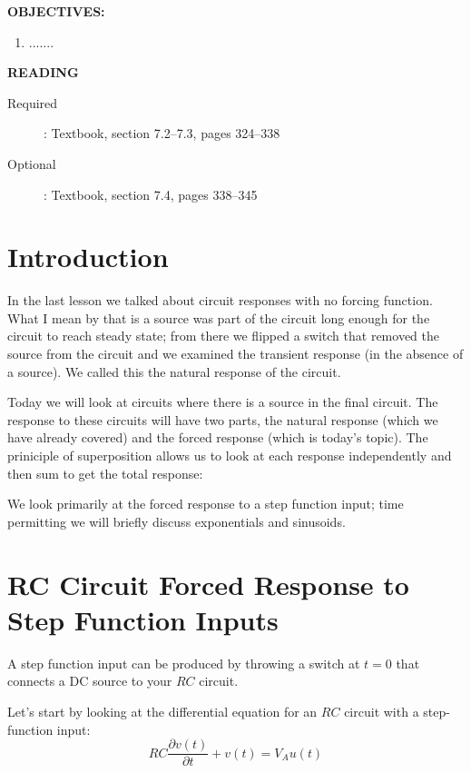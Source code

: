 \documentclass{handout}
\begin{document}
\maketitle

\textbf{OBJECTIVES:}
\begin{enumerate}
\item .......
\end{enumerate}

\textbf{READING}
\begin{description}
\item [Required]:
Textbook, section 7.2--7.3, pages 324--338

\item [Optional]: Textbook, section 7.4, pages 338--345
\end{description}

\section{Introduction}
In the last lesson we talked about circuit responses with no forcing function.  What I mean by that is a source was part of the circuit long enough for the circuit to reach steady state; from there we flipped a switch that removed the source from the circuit and we examined the transient response (in the absence of a source).  We called this the natural response of the circuit.

Today we will look at circuits where there is a source in the final circuit.  The response to these circuits will have two parts, the natural response (which we have already covered) and the forced response (which is today's topic).  The priniciple of superposition allows us to look at each response independently and then sum to get the total response:
\soln{0.5in}{
\[
v(t) = v_N(t)+v_F(t)
\]
}

We look primarily at the forced response to a step function input; time permitting we will briefly discuss exponentials and sinusoids.

\section{RC Circuit Forced Response to Step Function Inputs}
A step function input can be produced by throwing a switch at $t=0$ that connects a DC source to your $RC$ circuit.

Let's start by looking at the differential equation for an $RC$ circuit with a step-function input:
\begin{equation}
RC\frac{\partial v(t)}{\partial t}+v(t) = V_Au(t)
\end{equation}
\end{document}
